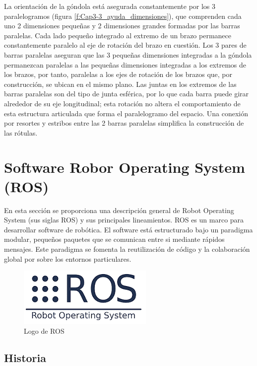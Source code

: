     La orientación de la góndola está asegurada constantemente por los 3 paralelogramos (figura \eqref{f:Cap3-3_ayuda_dimensiones}), que comprenden cada uno 2 dimensiones pequeñas y 2 dimensiones grandes formadas por las barras paralelas. Cada lado pequeño integrado al extremo de un brazo permanece constantemente paralelo al eje de rotación del brazo en cuestión. Los 3 pares de barras paralelas aseguran que las 3 pequeñas dimensiones integradas a la góndola permanezcan paralelas a las pequeñas dimensiones integradas a los extremos de los brazos, por tanto, paralelas a los ejes de rotación de los brazos que, por construcción, se ubican en el mismo plano. Las juntas en los extremos de las barras paralelas son del tipo de junta esférica, por lo que cada barra puede girar alrededor de su eje longitudinal; esta rotación no altera el comportamiento de esta estructura articulada que forma el paralelogramo del espacio. Una conexión por resortes y estribos entre las 2 barras paralelas simplifica la construcción de las rótulas.
    
    \newpage

\section{Software Robor Operating System (ROS)}
    
        En esta sección se proporciona una descripción general de Robot Operating System (sus siglas ROS) y sus principales lineamientos. ROS es un marco para desarrollar software de robótica. El software está estructurado bajo un paradigma modular, pequeños paquetes que se comunican entre si mediante rápidos mensajes. Este paradigma se fomenta la reutilización de código y la colaboración global por sobre los entornos particulares.
    
    \begin{figure}[htb]
        \centering
        \includegraphics[width=0.5\linewidth]{Main/Chapter3/Images3/3-4/logo-ros.png}
        \caption{Logo de ROS \cite{ros2222}}
        \label{f:Cap3-4_logo_ros}
    \end{figure}
    
    \subsection{Historia}
    
